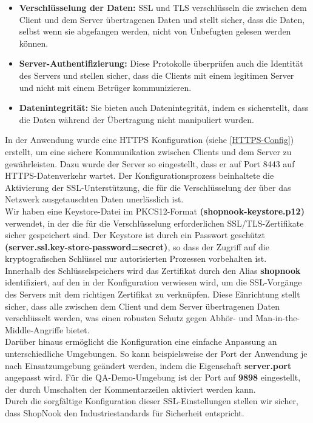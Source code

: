 \begin{itemize}
	\item \textbf{Verschlüsselung der Daten:} SSL und TLS verschlüsseln die zwischen dem Client und dem Server übertragenen Daten und stellt sicher, dass die Daten, selbst wenn sie abgefangen werden, nicht von Unbefugten gelesen werden können.
	\item \textbf{Server-Authentifizierung:} Diese Protokolle überprüfen auch die Identität des Servers und stellen sicher, dass die Clients mit einem legitimen Server und nicht mit einem Betrüger kommunizieren.
	\item \textbf{Datenintegrität:} Sie bieten auch Datenintegrität, indem es sicherstellt, dass die Daten während der Übertragung nicht manipuliert wurden.
\end{itemize}
In der Anwendung wurde eine HTTPS Konfiguration (siehe \ref{HTTPS-Config}) erstellt, um eine sichere Kommunikation zwischen Clients und dem Server zu gewährleisten. Dazu wurde der Server so eingestellt, dass er auf Port 8443 auf HTTPS-Datenverkehr wartet. Der Konfigurationsprozess beinhaltete die Aktivierung der SSL-Unterstützung, die für die Verschlüsselung der über das Netzwerk ausgetauschten Daten unerlässlich ist.\\
Wir haben eine Keystore-Datei im PKCS12-Format \textbf{(shopnook-keystore.p12)} verwendet, in der die für die Verschlüsselung erforderlichen SSL/TLS-Zertifikate sicher gespeichert sind. Der Keystore ist durch ein Passwort geschützt \textbf{(server.ssl.key-store-password=secret)}, so dass der Zugriff auf die kryptografischen Schlüssel nur autorisierten Prozessen vorbehalten ist.\\
Innerhalb des Schlüsselspeichers wird das Zertifikat durch den Alias \textbf{shopnook} identifiziert, auf den in der Konfiguration verwiesen wird, um die SSL-Vorgänge des Servers mit dem richtigen Zertifikat zu verknüpfen. Diese Einrichtung stellt sicher, dass alle zwischen dem Client und dem Server übertragenen Daten verschlüsselt werden, was einen robusten Schutz gegen Abhör- und Man-in-the-Middle-Angriffe bietet.\\
Darüber hinaus ermöglicht die Konfiguration eine einfache Anpassung an unterschiedliche Umgebungen. So kann beispielsweise der Port der Anwendung je nach Einsatzumgebung geändert werden, indem die Eigenschaft \textbf{server.port} angepasst wird. Für die QA-Demo-Umgebung ist der Port auf \textbf{9898} eingestellt, der durch Umschalten der Kommentarzeilen aktiviert werden kann.\\
Durch die sorgfältige Konfiguration dieser SSL-Einstellungen stellen wir sicher, dass ShopNook den Industriestandards für Sicherheit entspricht.\newpage

